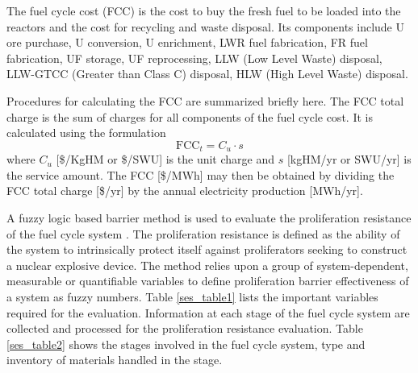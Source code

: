 The fuel cycle cost (FCC) is the cost to buy the fresh fuel to be loaded into
the reactors and the cost for recycling and waste disposal.  Its
components include U ore purchase, U conversion, U enrichment, LWR fuel
fabrication, FR fuel fabrication, UF storage, UF reprocessing, LLW
(Low Level Waste) disposal, LLW-GTCC (Greater than Class C) disposal,
HLW (High Level Waste) disposal. 

Procedures for calculating the FCC are 
summarized briefly here.  The FCC
total charge is the sum of charges for all components of the fuel cycle
cost.  It is calculated using the formulation
\begin{equation}
\label{ses_FCC}
\mbox{FCC}_t = C_u \cdot s
\end{equation}
where $C_u$ [\$/KgHM or \$/SWU] is the unit charge and $s$ [kgHM/yr or SWU/yr] 
is the service amount. The FCC [\$/MWh] may then be obtained by dividing the 
FCC total charge [\$/yr] by the annual electricity production [MWh/yr].

A fuzzy logic based barrier method is used to evaluate the
proliferation resistance of the fuel cycle system \cite{Li2009}. The proliferation
resistance is defined as the ability of the system to intrinsically
protect itself against proliferators seeking to construct a nuclear
explosive device. The method relies upon a group of system-dependent,
measurable or quantifiable variables to define proliferation barrier
effectiveness of a system as fuzzy numbers. 
Table \ref{ses_table1} lists the important variables required for
the evaluation. Information at each stage of the fuel cycle system are
collected and processed for the proliferation resistance evaluation.
Table \ref{ses_table2} shows the stages involved in the fuel cycle system, type and
inventory of materials handled in the stage.


